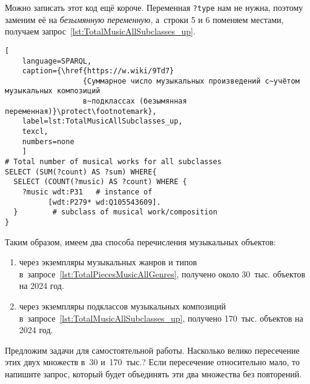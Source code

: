 Можно записать этот код ещё короче. 
Переменная \lstinline|?type| нам не нужна, 
поэтому заменим её на \emph{безымянную переменную}, 
а~строки 5 и 6 поменяем местами, 
получаем запрос~\ref{lst:TotalMusicAllSubclasses_up}.

\begin{lstlisting}[ 
    language=SPARQL,
    caption={\href{https://w.wiki/9Td7}
                  {Суммарное число музыкальных произведений с~учётом музыкальных композиций 
                  в~подклассах (безымянная переменная)}\protect\footnotemark},
    label=lst:TotalMusicAllSubclasses_up,
    texcl,
    numbers=none
    ]
# Total number of musical works for all subclasses
SELECT (SUM(?count) AS ?sum) WHERE{
  SELECT (COUNT(?music) AS ?count) WHERE {
    ?music wdt:P31   # instance of
          [wdt:P279* wd:Q105543609].
  }        # subclass of musical work/composition
}
\end{lstlisting}%

Таким образом, имеем два способа перечисления музыкальных объектов: 
\begin{enumerate}
    \item через экземпляры музыкальных жанров и типов в~запросе~\ref{lst:TotalPiecesMusicAllGenres}, 
        получено около 30~тыс. объектов на 2024 год. 

    \item через экземпляры подклассов музыкальных композиций в~запросе~\ref{lst:TotalMusicAllSubclasses_up}, 
        получено 170~тыс. объектов на 2024 год.
\end{enumerate}

Предложим задачи для самостоятельной работы. 
Насколько велико пересечение этих двух множеств в~30 и~170~тыс.? 
Если пересечение относительно мало, то напишите запрос, 
который будет объединять эти два множества без повторений. 


